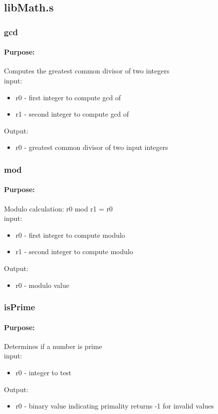 \documentclass{article}
\begin{document}
    \subsection{libMath.s}
        \subsubsection{gcd}
            \paragraph*{Purpose:}
                {Computes the greatest common divisor of two integers \\ }
                input:\begin{itemize}
                    \item r0 - first integer to compute gcd of
                    \item r1 - second integer to compute gcd of
                \end{itemize}
                Output:\begin{itemize}
                    \item r0 - greatest common divisor of two input integers
                \end{itemize}
        \subsubsection{mod}
            \paragraph*{Purpose:}
                {Modulo calculation: r0 mod r1 = r0 \\ }
                input:\begin{itemize}
                    \item r0 - first integer to compute modulo
                    \item r1 - second integer to compute modulo
                \end{itemize}
                Output:\begin{itemize}
                    \item r0 - modulo value
                \end{itemize}
        \subsubsection{isPrime}
            \paragraph*{Purpose:}
                {Determines if a number is prime \\ }
                input:\begin{itemize}
                    \item r0 - integer to test
                \end{itemize}
                Output:\begin{itemize}
                    \item r0 - binary value indicating primality returns -1 for invalid values
                \end{itemize}
\end{document}
